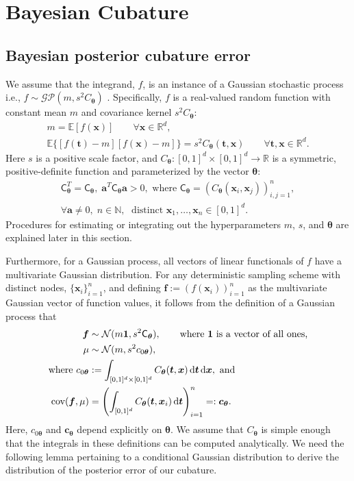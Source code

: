 \documentclass{svjour3}                     %
\newcommand{\bm}[1]{\boldsymbol{#1}}
\newcommand{\dif}[1]{\text{d}{#1}}
\newcommand{\D}[1]{\text{d}{#1}}
\newcommand{\reals}{\mathbb{R}}
\newcommand{\Ex}{\mathbb{E}}
\newcommand{\vtheta}{{\bm{\theta}}}
\newcommand{\va}{\bm{a}}
\newcommand{\vc}{\bm{c}}
\newcommand{\vf}{\bm{f}}
\newcommand{\vt}{\bm{t}}
\newcommand{\vx}{\bm{x}}
\newcommand{\vone}{\bm{1}}
\newcommand{\mC}{\mathsf{C}}
\newcommand{\mCtheta}{{\mathsf{C}_{\vtheta}}}
\newcommand{\cov}{{\textup{cov}}}
\newcommand{\calN}{\mathcal{N}}
\begin{document}
\section{Bayesian Cubature} \label{sec:BC} 


\subsection{Bayesian posterior cubature error}
\label{sec:BayesPostErr}

We assume that the integrand, $f$, is an instance of a Gaussian stochastic process  i.e., $f \sim \mathcal{GP}(m,s^2 C_\vtheta)$  \citep{Dia88a,OHa91a,Rit00a,RasGha03a,BriEtal18a}.  Specifically, $f$ is a real-valued random function with constant mean $m$ and covariance kernel $s^2C_\vtheta$:
\begin{gather*}
        m = \Ex[f(\vx)] \qquad \forall \vx \in \reals^d, \\
        \Ex\{[f(\vt) - m][f(\vx) -m]\} = s^2 C_\vtheta(\vt,\vx) \qquad \forall \vt, \vx \in \reals^d.
\end{gather*}
Here $s$ is a positive scale factor, and $C_\vtheta: [0,1]^d \times [0,1]^d \to \mathbb{R} $ is a symmetric, positive-definite function and parameterized by the vector $\vtheta$:
\begin{multline} \label{FJH:eq:CondPosDef}
\mC_\vtheta^T = \mC_\vtheta,  \; \va^T \mC_\vtheta \va > 0,  \text{ where }  \mC_\vtheta = \left(  C_\vtheta(\vx_i,\vx_j)  \right)_{i,j=1}^n,\\
 \forall \va \ne 0, \;
 n\in \mathbb{N}, \; \text{ distinct }\vx_1, \ldots, \vx_n \in [0,1]^d.
\end{multline}
Procedures for estimating or integrating out the hyperparameters $m$, $s$, and $\vtheta$ are explained later in this section.

Furthermore, for a Gaussian process, all vectors of linear functionals of $f$ have a multivariate Gaussian distribution. For any deterministic sampling scheme with distinct nodes, $\{\vx_i\}_{i=1}^n$, and defining  $\vf  := \left( f(\vx_i)\right)_{i=1}^n$ as the multivariate Gaussian vector of function values, it follows from the definition of a Gaussian process that 
\begin{subequations} \label{eqn:fGaussDist}
\begin{align}
\vf  & \sim \calN(m \vone, s^2 \mCtheta),  \qquad \text{where $\vone$ is a vector of all ones,}\\
\mu & \sim \calN(m, s^2 c_{0\vtheta}), 
\\
\text{where }
c_{0\vtheta} &:= \int_{[0,1]^{d}\times [0,1]^{d}} C_\vtheta(\vt,\vx) \, \dif{\vt} \, \dif{\vx}, \text{ and}\\
\cov(\vf, \mu) &= \left(  \int_{[0,1]^d} C_\vtheta(\vt,\vx_i) \, \D \vt \right)_{i=1}^n  =: \vc_\vtheta.
\end{align}
\end{subequations}
Here, $c_{0\vtheta}$ and $\vc_\vtheta$ depend explicitly on $\vtheta$.  We assume that $C_\vtheta$ is simple enough that the integrals in these definitions can be computed analytically.  We need the following lemma pertaining to a conditional Gaussian distribution to derive the distribution of the posterior error of our cubature. 
\end{document}
